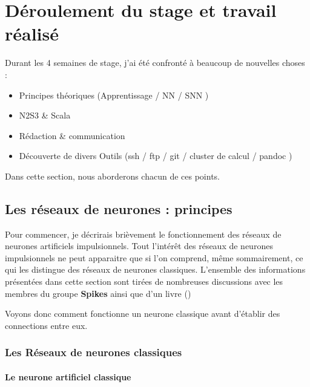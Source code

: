 \hypertarget{duxe9roulement-du-stage-et-travail-ruxe9alisuxe9}{%
\chapter{Déroulement du stage et travail
réalisé}\label{duxe9roulement-du-stage-et-travail-ruxe9alisuxe9}}

Durant les 4 semaines de stage, j'ai été confronté à beaucoup de
nouvelles choses :

\begin{itemize}
\tightlist
\item
  Principes théoriques (Apprentissage / NN / SNN )
\item
  N2S3 \& Scala
\item
  Rédaction \& communication
\item
  Découverte de divers Outils (ssh / ftp / git / cluster de calcul /
  pandoc )
\end{itemize}

Dans cette section, nous aborderons chacun de ces points.

\hypertarget{les-ruxe9seaux-de-neurones-principes}{%
\section{Les réseaux de neurones :
principes}\label{les-ruxe9seaux-de-neurones-principes}}

Pour commencer, je décrirais brièvement le fonctionnement des réseaux de
neurones artificiels impulsionnels. Tout l'intérêt des réseaux de
neurones impulsionnels ne peut apparaitre que si l'on comprend, même
sommairement, ce qui les distingue des réseaux de neurones classiques.
L'ensemble des informations présentées dans cette section sont tirées de
nombreuses discussions avec les membres du groupe \textbf{Spikes} ainsi
que d'un livre (\cite{naturalHandbook})

Voyons donc comment fonctionne un neurone classique avant d'établir des
connections entre eux.

\hypertarget{les-ruxe9seaux-de-neurones-classiques}{%
\subsection{Les Réseaux de neurones
classiques}\label{les-ruxe9seaux-de-neurones-classiques}}

\hypertarget{le-neurone-artificiel-classique}{%
\subsubsection{Le neurone artificiel
classique}\label{le-neurone-artificiel-classique}}

